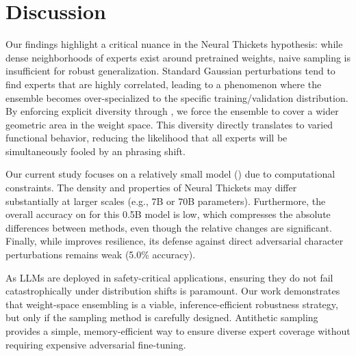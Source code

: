 \section{Discussion}

Our findings highlight a critical nuance in the Neural Thickets hypothesis: while dense neighborhoods of experts exist around pretrained weights, naive sampling is insufficient for robust generalization. Standard Gaussian perturbations tend to find experts that are highly correlated, leading to a phenomenon where the ensemble becomes over-specialized to the specific training/validation distribution. By enforcing explicit diversity through \methodname, we force the ensemble to cover a wider geometric area in the weight space. This diversity directly translates to varied functional behavior, reducing the likelihood that all experts will be simultaneously fooled by an \ood phrasing shift.

Our current study focuses on a relatively small model (\qwen) due to computational constraints. The density and properties of Neural Thickets may differ substantially at larger scales (e.g., 7B or 70B parameters). Furthermore, the overall accuracy on \gsm for this 0.5B model is low, which compresses the absolute differences between methods, even though the relative changes are significant. Finally, while \methodname improves \ood resilience, its defense against direct adversarial character perturbations remains weak (5.0\% accuracy).

As LLMs are deployed in safety-critical applications, ensuring they do not fail catastrophically under distribution shifts is paramount. Our work demonstrates that weight-space ensembling is a viable, inference-efficient robustness strategy, but only if the sampling method is carefully designed. Antithetic sampling provides a simple, memory-efficient way to ensure diverse expert coverage without requiring expensive adversarial fine-tuning.